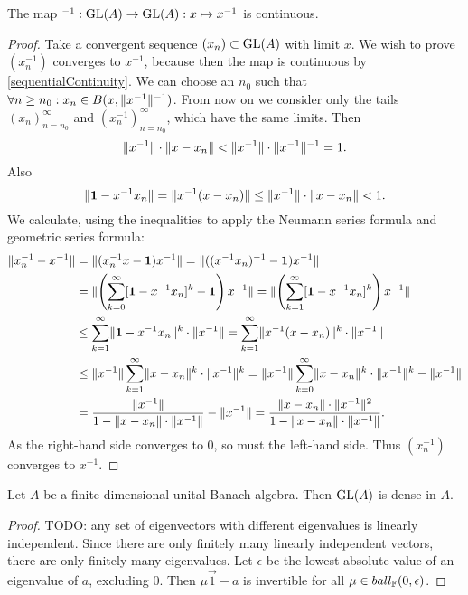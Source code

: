 \begin{proposition} \label{inverseMapContinuous}
The map $^{-1}: \operatorname{GL}(A)\to\operatorname{GL}(A): x\mapsto x^{-1}$ is continuous.
\end{proposition}
\begin{proof}
Take a convergent sequence $(x_n)\subset\operatorname{GL}(A)$ with limit $x$. We wish to prove $(x_n^{-1})$ converges to $x^{-1}$, because then the map is continuous by \ref{sequentialContinuity}. We can choose an $n_0$ such that $\forall n\geq n_0: x_n \in B(x,\lVert x^{-1}\rVert^{-1})$. From now on we consider only the tails $(x_n)_{n=n_0}^\infty$ and $(x_n^{-1})_{n=n_0}^\infty$, which have the same limits. Then
\[ \lVert x^{-1}\rVert\cdot\lVert x-x_n\rVert < \lVert x^{-1}\rVert\cdot\lVert x^{-1}\rVert^{-1} = 1. \]
Also
\[ \lVert\boldsymbol{\mathrm{1}} - x^{-1}x_n\rVert = \lVert x^{-1}(x-x_n)\rVert \leq \lVert x^{-1}\rVert\cdot\lVert x-x_n\rVert < 1. \]
We calculate, using the inequalities to apply the Neumann series formula and geometric series formula:
\begin{align*}
\lVert x_n^{-1} - x^{-1}\rVert &= \lVert(x_n^{-1}x - \boldsymbol{\mathrm{1}})x^{-1}\rVert = \lVert((x^{-1}x_n)^{-1} - \boldsymbol{\mathrm{1}})x^{-1}\rVert \\
&= \lVert\left(\sum_{k=0}^\infty[\boldsymbol{\mathrm{1}} - x^{-1}x_n]^k - \boldsymbol{\mathrm{1}}\right)x^{-1}\rVert = \lVert\left(\sum_{k=1}^\infty[\boldsymbol{\mathrm{1}} - x^{-1}x_n]^k\right)x^{-1}\rVert \\
&\leq \sum_{k=1}^\infty\lVert\boldsymbol{\mathrm{1}} - x^{-1}x_n\rVert^k\cdot\lVert x^{-1}\rVert = \sum_{k=1}^\infty\lVert x^{-1}(x - x_n)\rVert^k\cdot\lVert x^{-1}\rVert \\
&\leq \lVert x^{-1}\rVert\sum_{k=1}^\infty\lVert x - x_n\rVert^k\cdot\lVert x^{-1}\rVert^{k} = \lVert x^{-1}\rVert\sum_{k=0}^\infty\lVert x - x_n\rVert^k\cdot\lVert x^{-1}\rVert^{k} - \lVert x^{-1}\rVert \\
&= \frac{\lVert x^{-1}\rVert}{1-\lVert x - x_n\rVert\cdot\lVert x^{-1}\rVert}-\lVert x^{-1}\rVert = \frac{\lVert x - x_n\rVert\cdot\lVert x^{-1}\rVert^2}{1-\lVert x - x_n\rVert\cdot\lVert x^{-1}\rVert}.
\end{align*}
As the right-hand side converges to $0$, so must the left-hand side. Thus $(x_n^{-1})$ converges to $x^{-1}$.
\end{proof}

\begin{lemma} \label{finiteDimensionsInvertiblesDense}
Let $A$ be a finite-dimensional unital Banach algebra. Then $\operatorname{GL}(A)$ is dense in $A$.
\end{lemma}
\begin{proof}
TODO: any set of eigenvectors with different eigenvalues is linearly independent. Since there are only finitely many linearly independent vectors, there are only finitely many eigenvalues. Let $\epsilon$ be the lowest absolute value of an eigenvalue of $a$, excluding $0$. Then $\mu \vec{1} - a$ is invertible for all $\mu\in ball_{\mathbb{F}}(0,\epsilon)$.
\end{proof}

